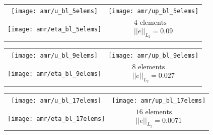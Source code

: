 \begin{frame}%
  {
    \begin{tabular}{cc} \\
      \texttt{[image: amr/u\_bl\_5elems]}&
      \texttt{[image: amr/up\_bl\_5elems]} \\
      \texttt{[image: amr/eta\_bl\_5elems]}&
      $\begin{array}{c}
        \text{4 elements} \\
        ||e||_{L_2} = 0.09
      \end{array}$\\
    \end{tabular}
  }
  {
    \begin{tabular}{cc} \\
      \texttt{[image: amr/u\_bl\_9elems]}&
      \texttt{[image: amr/up\_bl\_9elems]} \\
      \texttt{[image: amr/eta\_bl\_9elems]}&
      $\begin{array}{c}
        \text{8 elements} \\
        ||e||_{L_2} = 0.027
      \end{array}$\\
    \end{tabular}
  }
  {
    \begin{tabular}{cc} \\
      \texttt{[image: amr/u\_bl\_17elems]}&
      \texttt{[image: amr/up\_bl\_17elems]} \\
      \texttt{[image: amr/eta\_bl\_17elems]}&
      $\begin{array}{c}
        \text{16 elements} \\
        ||e||_{L_2} = 0.0071
      \end{array}$\\
    \end{tabular}
  }
\end{frame}



